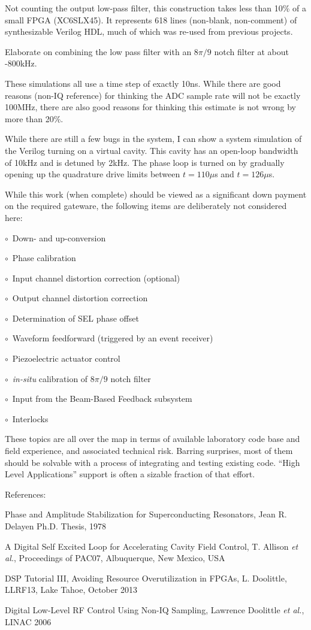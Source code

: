 Not counting the output low-pass filter, this construction takes less than
10\% of a small FPGA (XC6SLX45).  It represents 618 lines (non-blank,
non-comment) of synthesizable Verilog HDL, much of which was re-used from
previous projects.

Elaborate on combining the low pass filter with an $8\pi/9$ notch filter
at about -800\thinspace kHz.

These simulations all use a time step of exactly 10\thinspace ns.  While
there are good reasons (non-IQ reference) for thinking the ADC sample rate
will not be exactly 100\thinspace MHz, there are also good reasons for
thinking this estimate is not wrong by more than 20\%.

\vfill\eject
While there are still a few bugs in the system,
I can show a system simulation of the Verilog
turning on a virtual cavity.  This cavity has an open-loop bandwidth of
10\thinspace kHz and is detuned by 2\thinspace kHz.  The phase loop
is turned on by gradually opening up the quadrature drive limits between
$t=110$\thinspace $\mu$s and $t=126$\thinspace $\mu$s.



\vfill\eject
While this work (when complete) should be viewed as a significant
down payment on the required gateware,
the following items are deliberately not considered here:
\def\i{\hfil\break\strut\quad$\circ$~}
\i Down- and up-conversion
\i Phase calibration
\i Input channel distortion correction (optional)
\i Output channel distortion correction
\i Determination of SEL phase offset
\i Waveform feedforward (triggered by an event receiver)
\i Piezoelectric actuator control
\i {\it in-situ} calibration of $8\pi/9$ notch filter
\i Input from the Beam-Based Feedback subsystem
\i Interlocks

These topics are all over the map in terms of available laboratory
code base and field experience, and associated technical risk.
Barring surprises, most of them should be solvable with a process of
integrating and testing existing code.  ``High Level Applications''
support is often a sizable fraction of that effort.

References:

Phase and Amplitude Stabilization for Superconducting Resonators,
Jean R. Delayen Ph.D. Thesis, 1978

A Digital Self Excited Loop for Accelerating Cavity Field Control,
T. Allison {\it et al.}, Proceedings of PAC07, Albuquerque, New Mexico, USA

DSP Tutorial III, Avoiding Resource Overutilization in FPGAs,
L. Doolittle, LLRF13, Lake Tahoe, October 2013

Digital Low-Level RF Control Using Non-IQ Sampling,
Lawrence Doolittle {\it et al.}, LINAC 2006
\bye
